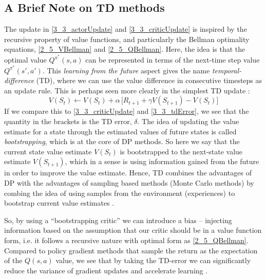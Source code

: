 \subsection{A Brief Note on TD methods}

The update in \eqref{3_3_actorUpdate} and \eqref{3_3_criticUpdate} is inspired by the recursive property of value functions, and particularly the Bellman optimality equations, \eqref{2_5_VBellman} and \eqref{2_5_QBellman}. Here, the idea is that the optimal value $Q^{\pi^*}(s,a)$ can be represented in terms of the next-time step value $Q^{\pi^*}(s',a')$. This \textit{learning from the future} aspect gives the name \textit{temporal-difference} (TD), where we can use the value difference in consecutive timesteps as an update rule. This is perhaps seen more clearly in the simplest TD update \cite{suttonAndBartoBook}:
\begin{equation}
    V(S_t) \leftarrow V(S_t) + \alpha \, \Big[ R_{t+1} + \gamma V(S_{t+1}) - V(S_t) \Big]
\end{equation}
If we compare this to \eqref{3_3_criticUpdate} and \eqref{3_3_tdError}, we see that the quantity in the brackets is the TD error, $\delta$. The idea of updating the value estimate for a state through the estimated values of future states is called \textit{bootstrapping}, which is at the core of DP methods. So here we say that the current state value estimate $V(S_t)$ is bootstrapped to the next-state value estimate $V(S_{t+1})$, which in a sense is using information gained from the future in order to improve the value estimate. Hence, TD combines the advantages of DP with the advantages of sampling based methods (Monte Carlo methods) by combing the idea of using samples from the environment (experiences) to bootstrap current value estimates \cite{suttonAndBartoBook}.
 
So, by using a ``bootstrapping critic'' we can introduce a bias -- injecting information based on the assumption that our critic should be in a value function form, i.e. it follows a recursive nature with optimal form as \eqref{2_5_QBellman}. Compared to policy gradient methods that sample the return as the expectation of the $Q(s,a)$ value, we see that by taking the TD-error we can significantly reduce the variance of gradient updates and accelerate learning \cite{suttonAndBartoBook}.

